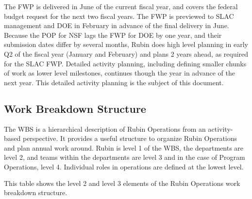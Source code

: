 The \gls{FWP} is delivered in June of the current fiscal year, and covers the federal budget request for the next two fiscal years.
The \gls{FWP} is previewed to \gls{SLAC} management and \gls{DOE} in February in advance of the final delivery in June.
Because the \gls{POP} for NSF lags the FWP for DOE by one year, and their submission dates differ by several months, Rubin does high level planning in early \gls{Q2} of the fiscal year (January and February) and plans 2 years ahead, as required for the \gls{SLAC} FWP.
Detailed activity planning, including defining smaller chunks of work as lower level milestones, continues though the year in advance of the next year.
This detailed activity planning is the subject of this document.

\subsection{Work Breakdown Structure}
\label{sec:wbs}

The \gls{WBS} is a hierarchical description of \gls{Rubin Operations} from an activity-based perspective.
It provides a useful structure to organize \gls{Rubin Operations} and plan annual work around.
Rubin is level 1 of the \gls{WBS}, the departments are level 2, and teams within the departments are level 3 and in the case of Program \gls{Operations}, level 4.
Individual roles in operations are defined at the lowest level.

This table shows the level 2 and level 3 elements of the \gls{Rubin Operations} work breakdown structure.



